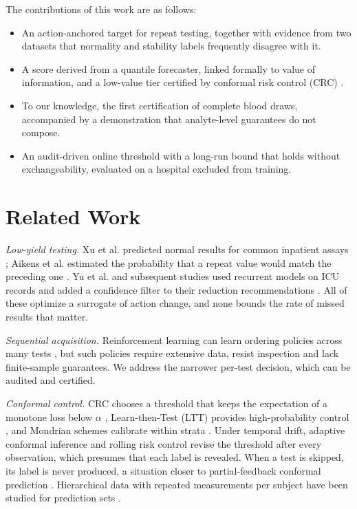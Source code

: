 \documentclass[conference]{IEEEtran}
\begin{document}
The contributions of this work are as follows:
\begin{itemize}
\item An action-anchored target for repeat testing, together with evidence from two datasets that normality and stability labels frequently disagree with it.
\item A score derived from a quantile forecaster, linked formally to value of information, and a low-value tier certified by conformal risk control (CRC) \cite{angelopoulos2024crc}.
\item To our knowledge, the first certification of complete blood draws, accompanied by a demonstration that analyte-level guarantees do not compose.
\item An audit-driven online threshold with a long-run bound that holds without exchangeability, evaluated on a hospital excluded from training.
\end{itemize}

\section{Related Work}
\textit{Low-yield testing.} Xu et al. predicted normal results for common inpatient assays \cite{xu2019lowyield}; Aikens et al. estimated the probability that a repeat value would match the preceding one \cite{aikens2023yield}. Yu et al. and subsequent studies used recurrent models on ICU records and added a confidence filter to their reduction recommendations \cite{yu2020deep,li2022external,huang2023confidence}. All of these optimize a surrogate of action change, and none bounds the rate of missed results that matter.

\textit{Sequential acquisition.} Reinforcement learning can learn ordering policies across many tests \cite{yu2023drl}, but such policies require extensive data, resist inspection and lack finite-sample guarantees. We address the narrower per-test decision, which can be audited and certified.

\textit{Conformal control.} CRC chooses a threshold that keeps the expectation of a monotone loss below $\alpha$ \cite{angelopoulos2024crc}, Learn-then-Test (LTT) provides high-probability control \cite{angelopoulos2021ltt}, and Mondrian schemes calibrate within strata \cite{vovk2005alrw}. Under temporal drift, adaptive conformal inference \cite{gibbs2021aci} and rolling risk control \cite{feldman2023online} revise the threshold after every observation, which presumes that each label is revealed. When a test is skipped, its label is never produced, a situation closer to partial-feedback conformal prediction \cite{ge2024semibandit}. Hierarchical data with repeated measurements per subject have been studied for prediction sets \cite{dunn2023hierarchical}.
\end{document}
